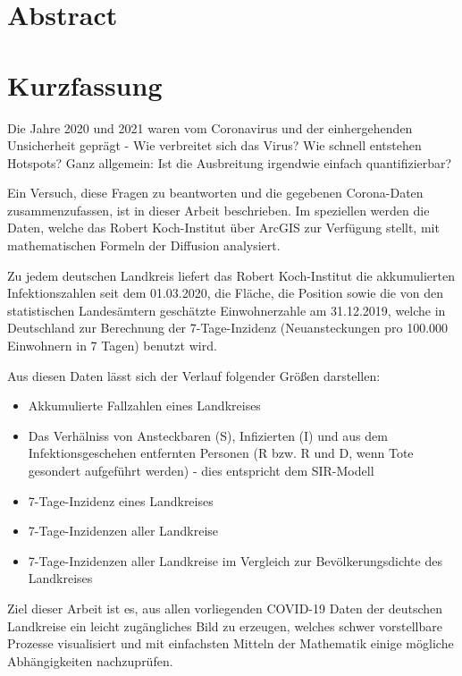 \chapter*{Abstract}
\chapter*{Kurzfassung}
Die Jahre 2020 und 2021 waren vom Coronavirus und der einhergehenden Unsicherheit geprägt - Wie verbreitet sich das Virus? Wie schnell entstehen Hotspots? Ganz allgemein: Ist die Ausbreitung irgendwie einfach quantifizierbar?

Ein Versuch, diese Fragen zu beantworten und die gegebenen Corona-Daten zusammenzufassen, ist in dieser Arbeit beschrieben. Im speziellen werden die Daten, welche das Robert Koch-Institut über ArcGIS zur Verfügung stellt, mit mathematischen Formeln der Diffusion analysiert.


Zu jedem deutschen Landkreis liefert das Robert Koch-Institut die akkumulierten Infektionszahlen seit dem 01.03.2020, die Fläche, die Position sowie die von den statistischen Landesämtern geschätzte Einwohnerzahle am 31.12.2019, welche in Deutschland zur Berechnung der 7-Tage-Inzidenz (Neuansteckungen pro 100.000 Einwohnern in 7 Tagen) benutzt wird.


Aus diesen Daten lässt sich der Verlauf folgender Größen darstellen:
\begin{itemize}
    \item Akkumulierte Fallzahlen eines Landkreises
    \item Das Verhälniss von Ansteckbaren (S), Infizierten (I) und aus dem Infektionsgeschehen entfernten Personen (R bzw. R und D, wenn Tote gesondert aufgeführt werden) - dies entspricht dem SIR-Modell
    \item 7-Tage-Inzidenz eines Landkreises
    \item 7-Tage-Inzidenzen aller Landkreise
    \item 7-Tage-Inzidenzen aller Landkreise im Vergleich zur Bevölkerungsdichte des Landkreises
\end{itemize}


Ziel dieser Arbeit ist es, aus allen vorliegenden COVID-19 Daten der deutschen Landkreise ein leicht zugängliches Bild zu erzeugen, welches schwer vorstellbare Prozesse visualisiert und mit einfachsten Mitteln der Mathematik einige mögliche Abhängigkeiten nachzuprüfen.

\newpage